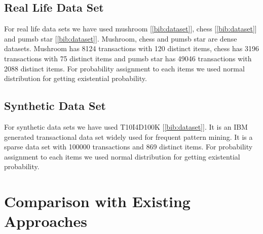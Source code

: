 \subsection{Real Life Data Set}
For real life data sets we have used mushroom [\ref{bib:dataset}], chess [\ref{bib:dataset}] and pumsb star [\ref{bib:dataset}]. Mushroom, chess and pumsb star are dense datasets. Mushroom has 8124 transactions with 120 distinct items, chess has 3196 transactions with 75 distinct items and pumsb star has 49046 transactions with 2088 distinct items. For probability assignment to each items we used normal distribution for getting existential probability.
\subsection{Synthetic Data Set}
For synthetic data sets we have used T10I4D100K [\ref{bib:dataset}]. It is an IBM generated transactional data set widely used for frequent pattern mining. It is a sparse data set with 100000 transactions and 869 distinct items. For probability assignment to each items we used normal distribution for getting existential probability.




\section{Comparison with Existing Approaches}

%
%